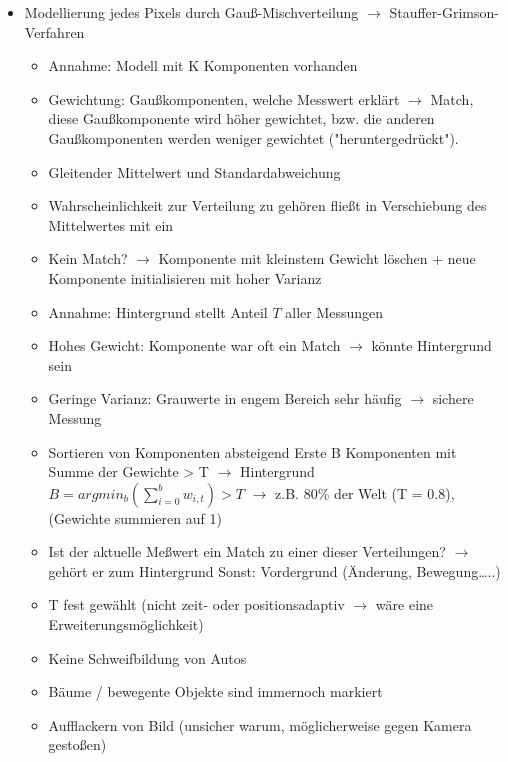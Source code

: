 \documentclass{report}
\begin{document}
\begin{itemize}
		\item Modellierung jedes Pixels durch Gauß-Mischverteilung $\rightarrow$ Stauffer-Grimson-Verfahren
		\begin{itemize}
			\item Annahme: Modell mit K Komponenten vorhanden
			\item Gewichtung: Gaußkomponenten, welche Messwert erklärt $\rightarrow$ Match, diese Gaußkomponente wird höher gewichtet, bzw. die anderen Gaußkomponenten werden weniger gewichtet ("heruntergedrückt").
			\item Gleitender Mittelwert und Standardabweichung
			\item Wahrscheinlichkeit zur Verteilung zu gehören fließt in Verschiebung des Mittelwertes mit ein
			\item Kein Match? $\rightarrow$ Komponente mit kleinstem Gewicht löschen + neue Komponente initialisieren mit hoher Varianz
			\newline
			\item Annahme: Hintergrund stellt Anteil $T$ aller Messungen
			\item Hohes Gewicht: Komponente war oft ein Match $\rightarrow$ könnte Hintergrund sein
			\item Geringe Varianz: Grauwerte in engem Bereich sehr häufig $\rightarrow$ sichere Messung
			\item Sortieren von Komponenten absteigend
			\newline Erste B Komponenten mit Summe der Gewichte > T $\rightarrow$ Hintergrund
			\newline $B = argmin_b(\sum_{i=0}^{b} w_{i,t}) > T$
			\newline $\rightarrow$ z.B. 80\% der Welt (T = 0.8), (Gewichte summieren auf 1)
			\item Ist der aktuelle Meßwert ein Match zu einer dieser Verteilungen? $\rightarrow$ gehört er zum Hintergrund
			\newline Sonst: Vordergrund (Änderung, Bewegung…..)
			\item T fest gewählt (nicht zeit- oder positionsadaptiv $\rightarrow$ wäre eine Erweiterungsmöglichkeit)
			\newline
			\item Keine Schweifbildung von Autos
			\item Bäume / bewegente Objekte sind immernoch markiert
			\item Aufflackern von Bild (unsicher warum, möglicherweise gegen Kamera gestoßen)
		\end{itemize}
	

\end{itemize}
\end{document}
